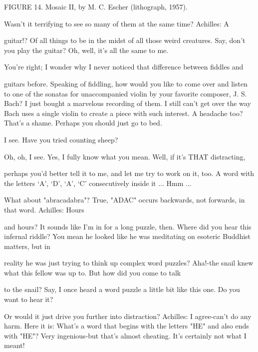 FIGURE 14. Mosaic II, by M. C. Escher (lithograph, 1957). 








\achilles Wasn't it terrifying to see so many of them at the same time? Achilles: A\par
guitar!? Of all things to be in the midst of all those weird creatures. Say, don't you play the guitar? 
\achilles Oh, well, it's all the same to me.\par

\achilles You're right; I wonder why I never noticed that difference between fiddles and\par
guitars before. Speaking of fiddling, how would you like to come over and listen to one of the sonatas for unaccompanied violin by your favorite composer, J. S. Bach? I just bought a marvelous recording of them. I still can't get over the way Bach uses a single violin to create a piece with such interest. 
\achilles A headache too? That's a shame. Perhaps you should just go to bed.\par

\achilles I see. Have you tried counting sheep?\par

\achilles Oh, oh, I see. Yes, I fully know what you mean. Well, if it's THAT distracting,\par
perhaps you'd better tell it to me, and let me try to work on it, too. 
\achilles A word with the letters `A', `D', `A', `C' consecutively inside it ... Hmm ...\par
What about "abracadabra"? 
\achilles True, "ADAC" occurs backwards, not forwards, in that word. Achilles: Hours\par
and hours? It sounds like I'm in for a long puzzle, then. Where did you hear this infernal riddle? 
\achilles You mean he looked like he was meditating on esoteric Buddhist matters, but in\par
reality he was just trying to think up complex word puzzles? 
\achilles Aha!-the snail knew what this fellow was up to. But how did you come to talk\par
to the snail? 
\achilles Say, I once heard a word puzzle a little bit like this one. Do you want to hear it?\par
Or would it just drive you further into distraction? Achilles: I agree-can't do any harm. Here it is: What's a word that begins with the letters "HE" and also ends with "HE"? 
\achilles Very ingenious-but that's almost cheating. It's certainly not what I meant!\par

